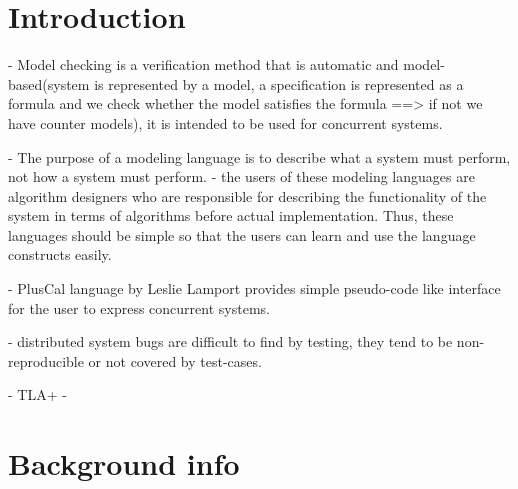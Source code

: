 \documentclass{thesul}
\begin{document}

\WritePartLabelInToc
\WriteChapterLabelInToc


\tableofcontents

\NoChapterHead


\mainmatter


\chapter{Introduction}

- Model checking is a verification method that is automatic and model-based(system is represented by a model, a specification is represented as a formula and we check whether the model satisfies the formula ==> if not we have counter models), it is intended to be used for concurrent systems.

- The purpose of a modeling language is to describe what a system must perform,
not how a system must perform.
- the users of these modeling languages are algorithm designers who
are responsible for describing the functionality of the system in terms of algorithms
before actual implementation. Thus, these languages should be simple so that the
users can learn and use the language constructs easily.

- PlusCal language by Leslie Lamport provides simple pseudo-code like interface
for the user to express concurrent systems.

- distributed system bugs are difficult to find by testing, they tend to be non-reproducible or not covered by test-cases.

- TLA+
- 

\chapter{Background info}
\end{document}
